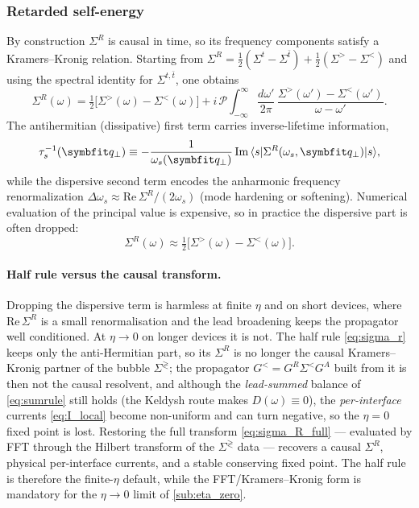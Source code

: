 \subsubsection{Retarded self-energy}
\label{subsub:KK}

By construction $\Sigma^R$ is causal in time, so its frequency
components satisfy a Kramers--Kronig relation. Starting from
$\Sigma^R = \tfrac{1}{2}(\Sigma^t - \Sigma^{\bar{t}}) +
\tfrac{1}{2}(\Sigma^> - \Sigma^<)$ and using the spectral identity for
$\Sigma^{t,\bar{t}}$, one obtains~\cite{guo_quantum_2020,wang_nonequilibrium_2014}
\begin{equation}\label{eq:sigma_R_full}
  \Sigma^R(\omega)
  = \tfrac{1}{2}\bigl[\Sigma^>(\omega) - \Sigma^<(\omega)\bigr]
    + i\,\mathcal{P}\!\!\int_{-\infty}^{\infty}\!\frac{d\omega'}{2\pi}\,
      \frac{\Sigma^>(\omega') - \Sigma^<(\omega')}{\omega - \omega'}.
\end{equation}
The antihermitian (dissipative) first term carries inverse-lifetime
information,
\begin{equation}\label{eq:lifetime}
  \tau_s^{-1}(\qp)
  \equiv -\frac{1}{\omega_s(\qp)}\,
     \mathrm{Im}\,\langle s|\Sigma^R(\omega_s,\qp)|s\rangle,
\end{equation}
while the dispersive second term encodes the anharmonic frequency
renormalization $\Delta\omega_s \approx
\mathrm{Re}\,\Sigma^R/(2\omega_s)$ (mode hardening or softening).
Numerical evaluation of the principal value is expensive, so in practice
the dispersive part is often dropped:
\begin{equation}\label{eq:sigma_r}
  \Sigma^R(\omega)
  \approx \tfrac{1}{2}\bigl[\Sigma^>(\omega) - \Sigma^<(\omega)\bigr].
\end{equation}

\paragraph{Half rule versus the causal transform.}
Dropping the dispersive term is harmless at finite $\eta$ and on short devices,
where $\mathrm{Re}\,\Sigma^R$ is a small renormalisation and the lead broadening
keeps the propagator well conditioned. At $\eta\to0$ on longer devices it is not.
The half rule \cref{eq:sigma_r} keeps only the anti-Hermitian part, so its
$\Sigma^R$ is no longer the causal Kramers--Kronig partner of the bubble
$\Sigma^{\gtrless}$; the propagator $G^<=G^R\Sigma^<G^A$ built from it is then not
the causal resolvent, and although the \emph{lead-summed} balance of
\cref{eq:sumrule} still holds (the Keldysh route makes $D(\omega)\equiv0$), the
\emph{per-interface} currents \cref{eq:I_local} become non-uniform and can turn
negative, so the $\eta=0$ fixed point is lost. Restoring the full transform
\cref{eq:sigma_R_full} --- evaluated by FFT through the Hilbert transform of the
$\Sigma^{\gtrless}$ data --- recovers a causal $\Sigma^R$, physical per-interface
currents, and a stable conserving fixed point. The half rule is therefore the
finite-$\eta$ default, while the FFT/Kramers--Kronig form is mandatory for the
$\eta\to0$ limit of \cref{sub:eta_zero}.


